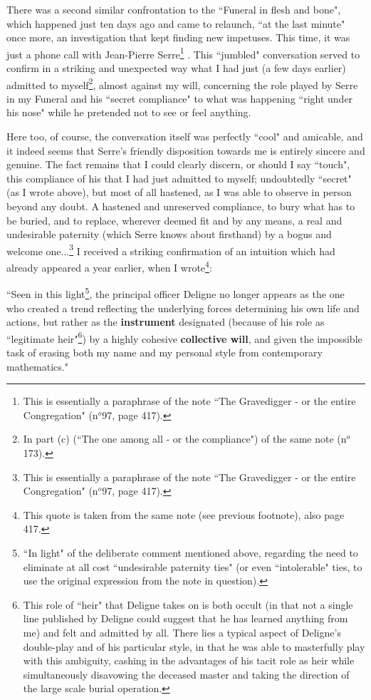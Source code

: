 There was a second similar confrontation to the ``Funeral in flesh and bone", which happened just ten days ago and came to relaunch, ``at the last minute" once more, an investigation that kept finding new impetuses. This time, it was just a phone call with Jean-Pierre Serre\footnote{This is essentially a paraphrase of the note ``The Gravedigger - or the entire Congregation" (n$^o$97, page 417).}
. This ``jumbled" conversation served to confirm in a striking and unexpected way what I had just (a few days earlier) admitted to myself\footnote{In part (c) (``The one among all - or the compliance") of the same note (n$^o$173).}, almost against my will, concerning the role played by Serre in my Funeral and his ``secret compliance" to what was happening ``right under his nose" while he pretended not to see or feel anything. 

Here too, of course, the conversation itself was perfectly ``cool" and amicable, and it indeed seems that Serre's friendly disposition towards me is entirely sincere and genuine. The fact remains that I could clearly discern, or should I say ``touch", this compliance of his that I had just admitted to myself; undoubtedly ``secret" (as I wrote above), but most of all hastened, as I was able to observe in person beyond any doubt. A hastened and unreserved compliance, to bury what has to be buried, and to replace, wherever deemed fit and by any means, a real and undesirable paternity (which Serre knows about firsthand) by a bogus and welcome one...\footnote{This is essentially a paraphrase of the note ``The Gravedigger - or the entire Congregation" (n$^o$97, page 417).} I received a striking confirmation of an intuition which had already appeared a year earlier, when I wrote\footnote{This quote is taken from the same note (see previous footnote), also page 417.}: 

\parindent=0.6cm
``Seen in this light\footnote{``In light" of the deliberate comment mentioned above, regarding the need to eliminate at all cost ``undesirable paternity ties" (or even ``intolerable" ties, to use the original expression from the note in question).}, the principal officer Deligne no longer appears as the one who created a trend reflecting the underlying forces determining his own life and actions, but rather as the \textbf{instrument} designated (because of his role as ``legitimate heir"\footnote{This role of ``heir" that Deligne takes on is both occult (in that not a single line published by Deligne could suggest that he has learned anything from me) and felt and admitted by all. There lies a typical aspect of Deligne's double-play and of his particular style, in that he was able to masterfully play with this ambiguity, cashing in the advantages of his tacit role as heir while simultaneously disavowing the deceased master and taking the direction of the large scale burial operation.}) by a highly cohesive \textbf{collective will}, and given the impossible task of erasing both my name and my personal style from contemporary mathematics." 

